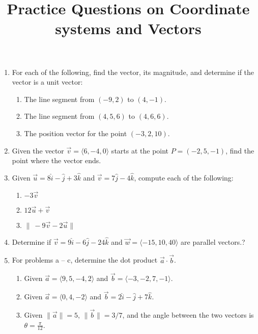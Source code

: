 \documentclass[11pt]{article}
\title{Practice Questions on  Coordinate systems and Vectors}
\author{}
\begin{document}
\maketitle
\thispagestyle{fancy}

\begin{enumerate}

    \item For each of the following, find the vector, its magnitude, and determine if the vector is a unit vector:
    \begin{enumerate}
        \item The line segment from \( (-9, 2) \) to \( (4, -1) \).
        \item The line segment from \( (4, 5, 6) \) to \( (4, 6, 6) \).
        \item The position vector for the point \( (-3, 2, 10) \).
        
    \end{enumerate}
    
    \item Given the vector \( \vec{v} = \langle 6, -4, 0 \rangle \) starts at the point \( P = (-2, 5, -1) \), find the point where the vector ends.
    \item Given \( \vec{u} = 8\hat{i} - \hat{j} + 3\hat{k} \) and \( \vec{v} = 7\hat{j} - 4\hat{k} \), compute each of the following:

    \begin{enumerate}
        \item \( -3\vec{v} \)
        \item \( 12\vec{u} + \vec{v} \)
        \item \( \|\ -9\vec{v} - 2\vec{u} \| \)
    \end{enumerate}
    \item Determine if \( \vec{v} = 9\hat{i} - 6\hat{j} - 24\hat{k} \) and \( \vec{w} = \langle -15, 10, 40 \rangle \) are parallel vectors.?
    \item For problems a – c, determine the dot product \( \vec{a} \cdot \vec{b} \).
    \begin{enumerate}
        \item Given \( \vec{a} = \langle 9, 5, -4, 2 \rangle \) and \( \vec{b} = \langle -3, -2, 7, -1 \rangle \).
        \item Given \( \vec{a} = \langle 0, 4, -2 \rangle \) and \( \vec{b} = 2\hat{i} - \hat{j} + 7\hat{k} \).
        \item Given \( \|\vec{a}\| = 5 \), \( \|\vec{b}\| = 3/7 \), and the angle between the two vectors is \( \theta = \frac{\pi}{12} \).
    \end{enumerate}


\end{enumerate}
\end{document}
